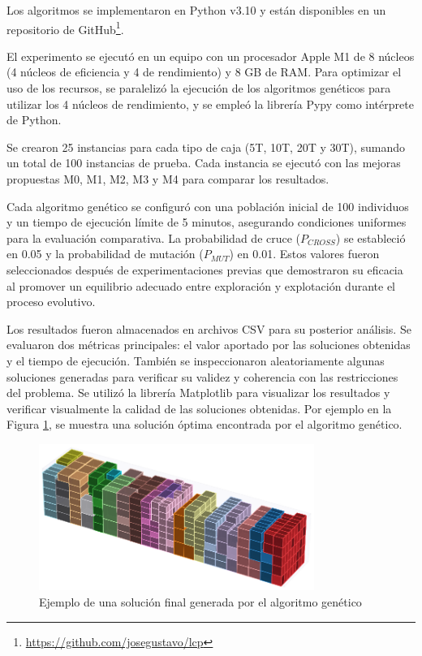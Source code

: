 Los algoritmos se implementaron en Python v3.10 y están disponibles en un repositorio de GitHub\footnote{\url{https://github.com/josegustavo/lcp}}.

El experimento se ejecutó en un equipo con un procesador Apple M1 de 8 núcleos (4 núcleos de eficiencia y 4 de rendimiento) y 8 GB de RAM. Para optimizar el uso de los recursos, se paralelizó la ejecución de los algoritmos genéticos para utilizar los 4 núcleos de rendimiento, y se empleó la librería Pypy como intérprete de Python.

Se crearon 25 instancias para cada tipo de caja (5T, 10T, 20T y 30T), sumando un total de 100 instancias de prueba. Cada instancia se ejecutó con las mejoras propuestas M0, M1, M2, M3 y M4 para comparar los resultados.

Cada algoritmo genético se configuró con una población inicial de 100 individuos y un tiempo de ejecución límite de 5 minutos, asegurando condiciones uniformes para la evaluación comparativa. La probabilidad de cruce ($P_{CROSS}$) se estableció en 0.05 y la probabilidad de mutación ($P_{MUT}$) en 0.01. Estos valores fueron seleccionados después de experimentaciones previas que demostraron su eficacia al promover un equilibrio adecuado entre exploración y explotación durante el proceso evolutivo.

Los resultados fueron almacenados en archivos CSV para su posterior análisis. Se evaluaron dos métricas principales: el valor aportado por las soluciones obtenidas y el tiempo de ejecución. También se inspeccionaron aleatoriamente algunas soluciones generadas para verificar su validez y coherencia con las restricciones del problema. Se utilizó la librería Matplotlib para visualizar los resultados y verificar visualmente la calidad de las soluciones obtenidas. Por ejemplo en la Figura \ref{fig:ejemplo_solucion}, se muestra una solución óptima encontrada por el algoritmo genético.

\begin{figure}[H]
    \centering
    \includegraphics[width=0.8\textwidth]{Figures/ejemplo_solucion.eps}
    \caption{Ejemplo de una solución final generada por el algoritmo genético}
    \label{fig:ejemplo_solucion}
\end{figure}

